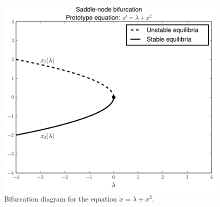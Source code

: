 \begin{figure}
\centering
\includegraphics[width=\textwidth]{SaddleNBifurcation.pdf}
\caption{Bifurcation diagram for the equation $\dot{x} = \lambda + x^2$.}
\label{bifurcation:sn}
\end{figure}

